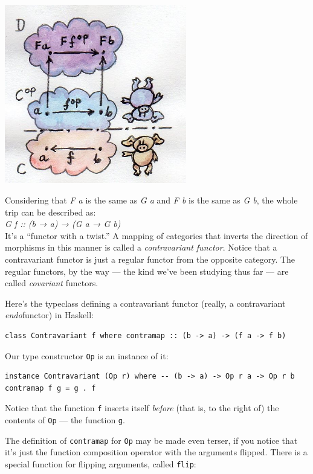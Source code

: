 \includegraphics[width=3.12500in]{images/contravariant.jpg}

Considering that \emph{F a} is the same as \emph{G a} and \emph{F b} is
the same as \emph{G b}, the whole trip can be described as:\\
\emph{G f :: (b → a) → (G a → G b)}\\
It's a ``functor with a twist.'' A mapping of categories that inverts
the direction of morphisms in this manner is called a
\emph{contravariant functor}. Notice that a contravariant functor is
just a regular functor from the opposite category. The regular functors,
by the way --- the kind we've been studying thus far --- are called
\emph{covariant} functors.

Here's the typeclass defining a contravariant functor (really, a
contravariant \emph{endo}functor) in Haskell:

\begin{verbatim}
class Contravariant f where contramap :: (b -> a) -> (f a -> f b)
\end{verbatim}

Our type constructor \texttt{Op} is an instance of it:

\begin{verbatim}
instance Contravariant (Op r) where -- (b -> a) -> Op r a -> Op r b contramap f g = g . f
\end{verbatim}

Notice that the function \texttt{f} inserts itself \emph{before} (that
is, to the right of) the contents of \texttt{Op} --- the function
\texttt{g}.

The definition of \texttt{contramap} for \texttt{Op} may be made even
terser, if you notice that it's just the function composition operator
with the arguments flipped. There is a special function for flipping
arguments, called \texttt{flip}:

